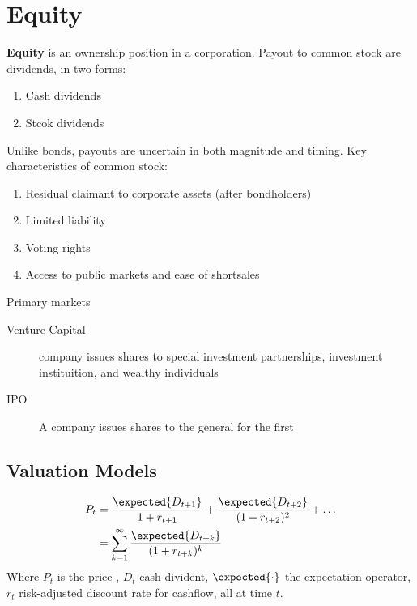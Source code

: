 \chapter{Equity}
\textbf{Equity} is an ownership position in a corporation. Payout to common stock are dividends, in two forms:
\begin{enumerate}
    \item Cash dividends
    \item Stcok dividends
\end{enumerate}
Unlike bonds, payouts are uncertain in both magnitude and timing. Key characteristics of common stock:
\begin{enumerate}
    \item Residual claimant to corporate assets (after bondholders)
    \item Limited liability
    \item Voting rights
    \item Access to public markets and ease of shortsales
\end{enumerate}
Primary markets
\begin{description}
    \item[Venture Capital] company issues shares to special investment partnerships, investment instituition, and wealthy individuals
    \item[IPO] A company issues shares to the general for the first  
\end{description}

\section{Valuation Models}

\begin{align*}
    P_t &= \dfrac{\expected{D_{t+1}}}{1 + r_{t+1}}+ \dfrac{\expected{D_{t+2}}}{(1 + r_{t+2})^2} + \dots \\
    &= \sum_{k = 1}^{\infty} \dfrac{\expected{D_{t+k}}}{(1 + r_{t+k})^k}
\end{align*}
Where \(P_t\) is the price , \(D_t\) cash divident, \(\expected{\cdot}\) the expectation operator, \(r_t\) risk-adjusted discount rate for cashflow, all at time \(t\).
